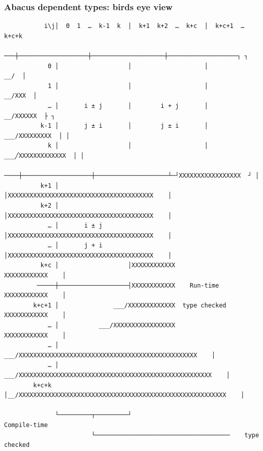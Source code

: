 \documentclass{beamer}
\begin{document}
\begin{frame}
    \begin{frame}[fragile]
        \frametitle{Abacus dependent types: birds eye view}
        \begin{tiny}
        \begin{verbatim}
           i\j│  0  1  …  k-1  k  │  k+1  k+2  …  k+c  │  k+c+1  …  k+c+k
           ───┼───────────────────┼────────────────────┼───────────────────┐ ┐
            0 │                   │                    │                __/  │
            1 │                   │                    │             __/XXX  │
            … │       i ± j       │        i + j       │          __/XXXXXX  ├ ┐
          k-1 │       j ± i       │        j ± i       │      ___/XXXXXXXXX  │ │
            k │                   │                    │  ___╱XXXXXXXXXXXXX  │ │
          ────┼───────────────────┼────────────────────┴─┘XXXXXXXXXXXXXXXXX  ┘ │
          k+1 │                   │XXXXXXXXXXXXXXXXXXXXXXXXXXXXXXXXXXXXXXXX    │
          k+2 │                   │XXXXXXXXXXXXXXXXXXXXXXXXXXXXXXXXXXXXXXXX    │
            … │       i ± j       │XXXXXXXXXXXXXXXXXXXXXXXXXXXXXXXXXXXXXXXX    │
            … │       j + i       │XXXXXXXXXXXXXXXXXXXXXXXXXXXXXXXXXXXXXXXX    │
          k+c │                   │XXXXXXXXXXXX                XXXXXXXXXXXX    │
         ─────┼───────────────────┤XXXXXXXXXXXX    Run-time    XXXXXXXXXXXX    │
        k+c+1 │               ___/XXXXXXXXXXXXX  type checked  XXXXXXXXXXXX    │
            … │           ___/XXXXXXXXXXXXXXXXX                XXXXXXXXXXXX    │
            … │       ___/XXXXXXXXXXXXXXXXXXXXXXXXXXXXXXXXXXXXXXXXXXXXXXXXX    │
            … │   ___/XXXXXXXXXXXXXXXXXXXXXXXXXXXXXXXXXXXXXXXXXXXXXXXXXXXXX    │
        k+c+k │__/XXXXXXXXXXXXXXXXXXXXXXXXXXXXXXXXXXXXXXXXXXXXXXXXXXXXXXXXX    │

              └─────────┬─────────┘                               Compile-time
                        └─────────────────────────────────────    type checked
        \end{verbatim}
        \end{tiny}
    \end{frame}


\end{frame}
\end{document}
